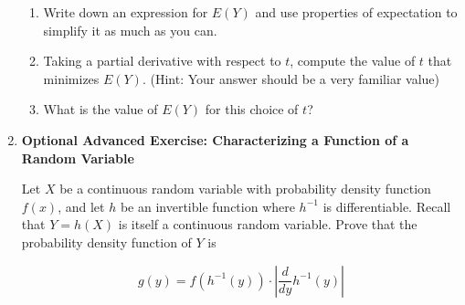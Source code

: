 \documentclass[12pt,a4paper]{article}
\numberwithin{equation}{subsection}
\begin{document}
\begin{enumerate}
\begin{enumerate}
\item Write down an expression for $E(Y)$ and use properties of expectation to simplify it as much as you can.
\item Taking a partial derivative with respect to $t$, compute the value of $t$ that minimizes $E(Y)$.  (Hint: Your answer should be a very familiar value)
\item What is the value of $E(Y)$ for this choice of $t$?
\end{enumerate}

\item \textbf{Optional Advanced Exercise: Characterizing a Function of a Random Variable}

Let $X$ be a continuous random variable with probability density function $f(x)$, and let $h$ be an invertible function where $h^{-1}$ is differentiable.  Recall that $Y = h(X)$ is itself a continuous random variable.  Prove that the probability density function of $Y$ is 

$$g(y) =f(h^{-1}(y)) \cdot \left| \frac{d}{dy}h^{-1}(y) \right| $$

\end{enumerate}
\end{document}
